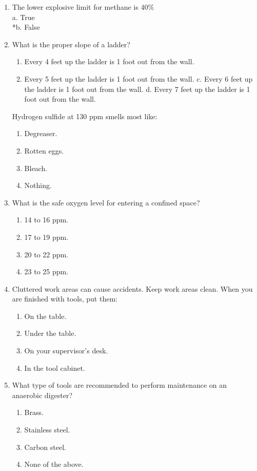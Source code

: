 \begin{enumerate}
\item The lower explosive limit for methane is 40\% \\

a. True \\
*b. False \\

\item What is the proper slope of a ladder?
\begin{enumerate}
\item Every 4 feet up the ladder is 1 foot out from the wall.
\item Every 5 feet up the ladder is 1 foot out from the wall.
c. Every 6 feet up the ladder is 1 foot out from the wall.
d. Every 7 feet up the ladder is 1 foot out from the wall.
\end{enumerate}

Hydrogen sulfide at 130 ppm smells most like:
\begin{enumerate}

\item Degreaser.
\item Rotten eggs.
\item Bleach.
\item Nothing.
\end{enumerate}

\item What is the safe oxygen level for entering a confined space?
\begin{enumerate}
\item 14 to 16 ppm.
\item 17 to 19 ppm.
\item 20 to 22 ppm.
\item 23 to 25 ppm.
\end{enumerate}

\item Cluttered work areas can cause accidents. Keep work areas clean. When you are finished with tools, put them:
\begin{enumerate}
\item On the table.
\item Under the table.
\item On your supervisor’s desk.
\item In the tool cabinet.
\end{enumerate}

\item What type of tools are recommended to perform maintenance on an anaerobic digester?
\begin{enumerate}
\item Brass.
\item Stainless steel.
\item Carbon steel.
\item None of the above.
\end{enumerate}


\end{enumerate}
